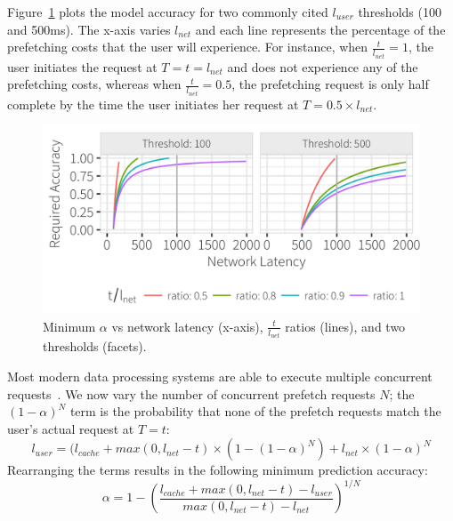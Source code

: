 Figure~\ref{fig:model_base} plots the model accuracy for two commonly cited $l_{user}$ thresholds (100 and 500ms).  The x-axis varies $l_{net}$ and each line represents the percentage of the prefetching costs that the user will experience.  For instance, when $\frac{t}{l_{net}}=1$, the user initiates the request at $T=t=l_{net}$ and does not experience any of the prefetching costs, whereas when $\frac{t}{l_{net}}=0.5$, the prefetching request is only half complete by the time the user initiates her request at $T=0.5\times l_{net}$.

\begin{figure}[ht]
	\centering
	\includegraphics[width=1\columnwidth]{figures/model_base}
 	\caption{Minimum $\alpha$ vs network latency (x-axis), $\frac{t}{l_{net}}$ ratios (lines), and two thresholds (facets).}
    \label{fig:model_base}
\end{figure}



Most modern data processing systems are able to execute multiple concurrent requests~\cite{ebenstein2016fluxquery,giannikis2012shareddb}.  
We now vary the number of concurrent prefetch requests $N$;
the $(1-\alpha)^N$ term is the probability that none of the prefetch requests match the user's actual request at $T=t$:
%
$$l_{user} = (l_{cache} + max(0, l_{net} - t)\times (1-(1-\alpha)^N) + l_{net}\times(1-\alpha)^N $$
%
Rearranging the terms results in the following minimum prediction accuracy:
%
$$\alpha = 1 - \left(\frac{l_{cache}+max(0,l_{net}-t)-l_{user}}{max(0,l_{net}-t)-l_{net}}\right)^{1/N}$$

